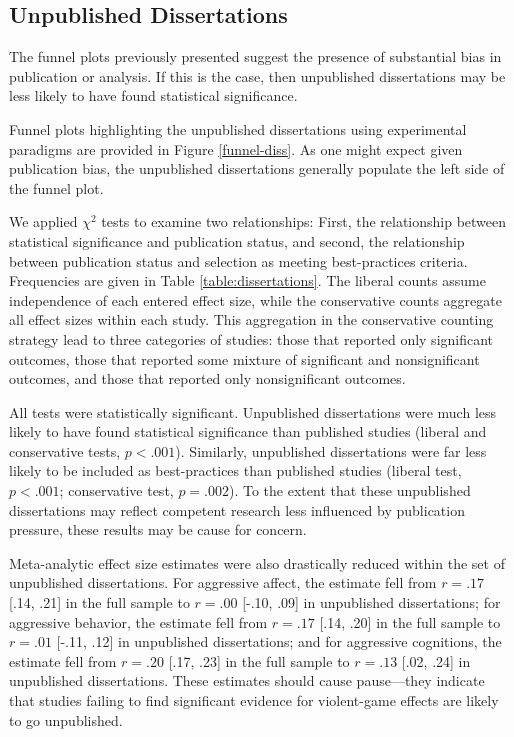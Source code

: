 \documentclass[man, mask]{apa6}
\begin{document}
\subsection{Unpublished Dissertations}
The funnel plots previously presented suggest the presence of substantial bias in publication or analysis. If this is the case, then unpublished dissertations may be less likely to have found statistical significance. 

Funnel plots highlighting the unpublished dissertations using experimental paradigms are provided in Figure \ref{funnel-diss}. As one might expect given publication bias, the unpublished dissertations generally populate the left side of the funnel plot. 

We applied $\chi^2$ tests to examine two relationships: First, the relationship between statistical significance and publication status, and second, the relationship between publication status and selection as meeting best-practices criteria. Frequencies are given in Table \ref{table:dissertations}. The liberal counts assume independence of each entered effect size, while the conservative counts aggregate all effect sizes within each study. This aggregation in the conservative counting strategy lead to three categories of studies: those that reported only significant outcomes, those that reported some mixture of significant and nonsignificant outcomes, and those that reported only nonsignificant outcomes.

All tests were statistically significant. Unpublished dissertations were much less likely to have found statistical significance than published studies (liberal and conservative tests, $p < .001$).
Similarly, unpublished dissertations were far less likely to be included as best-practices than published studies (liberal test, $p < .001$; conservative test, $p = .002$). 
To the extent that these unpublished dissertations may reflect competent research less influenced by publication pressure, these results may be cause for concern.

Meta-analytic effect size estimates were also drastically reduced within the set of unpublished dissertations. For aggressive affect, the estimate fell from $r = .17$ [.14, .21] in the full sample to $r = .00$ [-.10, .09] in unpublished dissertations; for aggressive behavior, the estimate fell from $r = .17$ [.14, .20] in the full sample to $r = .01$ [-.11, .12] in unpublished dissertations; and for aggressive cognitions, the estimate fell from $r = .20$ [.17, .23] in the full sample to $r =  .13$ [.02, .24] in unpublished dissertations.  These estimates should cause pause---they indicate that studies failing to find significant evidence for violent-game effects are likely to go unpublished.
\end{document}
